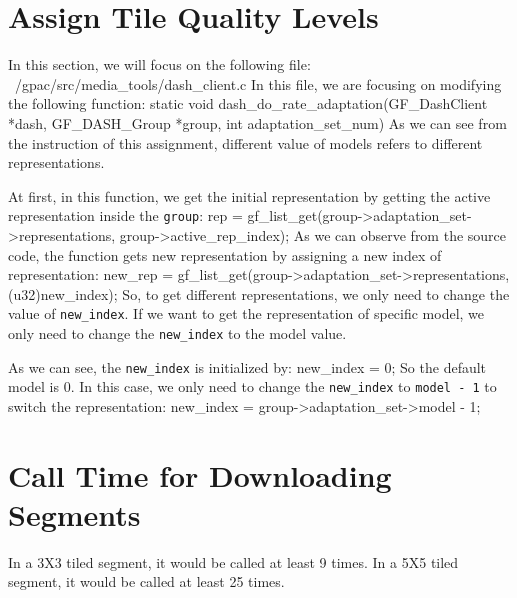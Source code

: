 \documentclass{article}%
\newenvironment{code}%
   {\snugshade\verbatim}%
   {\endverbatim\endsnugshade}
\begin{document}
\section{Assign Tile Quality Levels}
\begin{Large}
In this section, we will focus on the following file:
\begin{code}
    ~/gpac/src/media_tools/dash_client.c
\end{code}
In this file, we are focusing on modifying the following function:
\begin{code}
    static void dash_do_rate_adaptation(GF_DashClient *dash, 
        GF_DASH_Group *group, int adaptation_set_num)
\end{code}
As we can see from the instruction of this assignment, different value of models refers to different representations.

At first, in this function, we get the initial representation by getting the active representation inside the \texttt{group}:
\begin{code}
    	rep = gf_list_get(group->adaptation_set->representations, 
            group->active_rep_index);
\end{code}
As we can observe from the source code, the function gets new representation by assigning a new index of representation:
\begin{code}
    new_rep = gf_list_get(group->adaptation_set->representations, 
        (u32)new_index);
\end{code}
So, to get different representations, we only need to change the value of \texttt{new\_index}. If we want to get the representation of specific model, we only need to change the \texttt{new\_index} to the model value.

As we can see, the \texttt{new\_index} is initialized by:
\begin{code}
    new_index = 0;
\end{code}
So the default model is 0. In this case, we only need to change the \texttt{new\_index} to \texttt{model - 1} to switch the representation:
\begin{code}
    new_index = group->adaptation_set->model - 1;
\end{code}

\end{Large}
\newpage
\section{Call Time for Downloading Segments}
\begin{Large}
In a 3X3 tiled segment, it would be called at least 9 times. In a 5X5 tiled segment, it would be called at least 25 times.

\end{Large}
\end{document}
